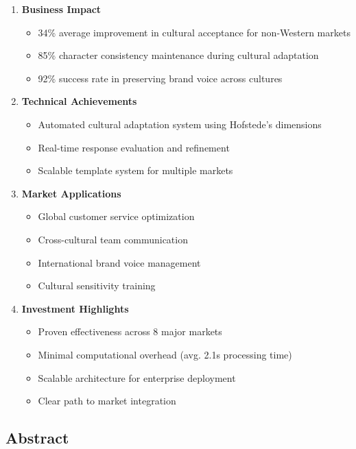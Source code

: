 \documentclass[
]{article}
\providecommand{\tightlist}{%
  \setlength{\itemsep}{0pt}\setlength{\parskip}{0pt}}
\begin{document}
\begin{enumerate}
\def\labelenumi{\arabic{enumi}.}
\tightlist
\item
  \textbf{Business Impact}

  \begin{itemize}
  \tightlist
  \item
    34\% average improvement in cultural acceptance for non-Western
    markets
  \item
    85\% character consistency maintenance during cultural adaptation
  \item
    92\% success rate in preserving brand voice across cultures
  \end{itemize}
\item
  \textbf{Technical Achievements}

  \begin{itemize}
  \tightlist
  \item
    Automated cultural adaptation system using Hofstede's dimensions
  \item
    Real-time response evaluation and refinement
  \item
    Scalable template system for multiple markets
  \end{itemize}
\item
  \textbf{Market Applications}

  \begin{itemize}
  \tightlist
  \item
    Global customer service optimization
  \item
    Cross-cultural team communication
  \item
    International brand voice management
  \item
    Cultural sensitivity training
  \end{itemize}
\item
  \textbf{Investment Highlights}

  \begin{itemize}
  \tightlist
  \item
    Proven effectiveness across 8 major markets
  \item
    Minimal computational overhead (avg. 2.1s processing time)
  \item
    Scalable architecture for enterprise deployment
  \item
    Clear path to market integration
  \end{itemize}
\end{enumerate}

\subsection{Abstract}\label{abstract}
\end{document}

